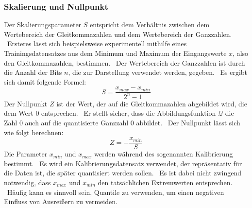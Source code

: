 \subsubsection{Skalierung und Nullpunkt}\label{subsubsec:SkalierungUndNullpunkt}
Der Skalierungsparameter $S$ entspricht dem Verhältnis zwischen dem Wertebereich der Gleitkommazahlen und dem Wertebereich der Ganzzahlen. \
Ersteres lässt sich beispielsweise experimentell mithilfe eines Trainingsdatensatzes aus dem Minimum und Maximum der Eingangswerte $x$, also den Gleitkommazahlen, bestimmen. \
Der Wertebereich der Ganzzahlen ist durch die Anzahl der Bits $n$, die zur Darstellung verwendet werden, gegeben. \ 
Es ergibt sich damit folgende Formel:
$$
S = \frac{x_{max} - x_{min}}{2^{n} - 1}
$$
Der Nullpunkt $Z$ ist der Wert, der auf die Gleitkommazahlen abgebildet wird, die dem Wert $0$ entsprechen. \
Er stellt sicher, dass die Abbildungsfunktion $\mathcal{Q}$ die Zahl $0$ auch auf die quantisierte Ganzzahl $0$ abbildet. \
Der Nullpunkt lässt sich wie folgt berechnen: \
$$
Z = -\frac{x_{min}}{S}
$$
Die Parameter $x_{min}$ und $x_{max}$ werden während des sogenannten Kalibrierung bestimmt. \
Es wird ein Kalibrierungsdatensatz verwendet, der repräsentativ für die Daten ist, die später quantisiert werden sollen. \
Es ist dabei nicht zwingend notwendig, dass $x_{max}$ und $x_{min}$ den tatsächlichen Extremwerten entsprechen. \
Häufig kann es sinnvoll sein, Quantile zu verwenden, um einen negativen Einfluss von Ausreißern zu vermeiden. \
